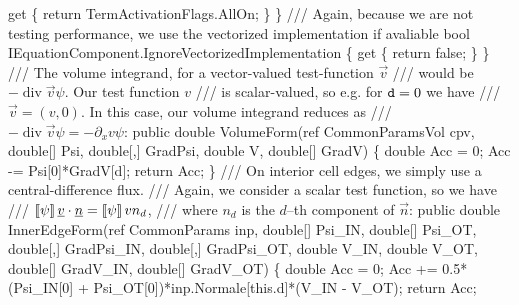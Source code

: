 {\btab    get \{ return TermActivationFlags.AllOn; \}\newline 
\btab \}\newline 
	/// Again, because we are not testing performance, we use the vectorized implementation if avaliable
\btab bool IEquationComponent.IgnoreVectorizedImplementation \{ \newline 
\btab \btab get \{ return false; \} \newline 
\btab \}\newline 
 \newline 
    /// The volume integrand, for a vector-valued test-function $\vec{v}$
    /// would be $-\operatorname{div}{\vec{v}} \psi$. Our test function $v$
    /// is scalar-valued, so e.g. for ${\tt d} = 0$ we have
    /// $\vec{v} = (v,0)$. In this case, our volume integrand reduces as 
    /// $-\operatorname{div}{\vec{v}} \psi = -\partial_x v \psi$:
\btab public double VolumeForm(ref CommonParamsVol cpv, \newline 
\btab \btab    double[] Psi, double[,] GradPsi, \newline 
\btab \btab    double V, double[] GradV) \{\newline 
 \newline 
\btab \btab double Acc = 0;\newline 
\btab \btab Acc -= Psi[0]*GradV[d];\newline 
\btab \btab return Acc;\newline 
\btab \}        \newline 
 \newline 
    /// On interior cell edges, we simply use a central-difference flux.
    /// Again, we consider a scalar test function, so we have
    /// $ \left[\!\left[{\psi}\right]\!\right] \underline{v} \cdot \underline{n} = \left[\!\left[{\psi}\right]\!\right] v n_d $,
    /// where $n_d$ is the $d$--th component of $\vec{n}$:
\btab public double InnerEdgeForm(ref CommonParams inp, \newline 
\btab \btab double[] Psi\_IN, double[] Psi\_OT, \newline 
\btab \btab double[,] GradPsi\_IN, double[,] GradPsi\_OT, \newline 
\btab \btab double V\_IN, double V\_OT, double[] GradV\_IN, double[] GradV\_OT) \{\newline 
 \newline 
\btab \btab double Acc = 0;\newline 
\btab \btab Acc += 0.5*(Psi\_IN[0] + Psi\_OT[0])*inp.Normale[this.d]*(V\_IN - V\_OT);\newline 
\btab \btab return Acc;  \newline 
}
